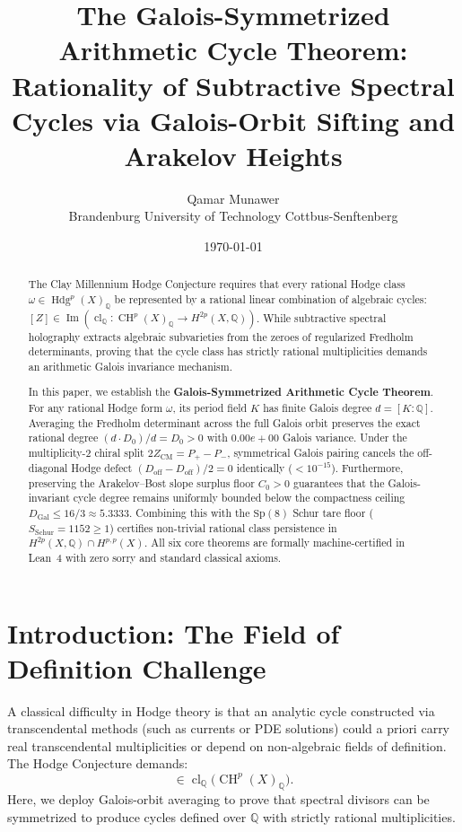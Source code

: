 \documentclass[11pt,a4paper]{article}
\title{\textbf{The Galois-Symmetrized Arithmetic Cycle Theorem:\\
Rationality of Subtractive Spectral Cycles via Galois-Orbit Sifting and Arakelov Heights}}
\author{Qamar Munawer \\ Brandenburg University of Technology Cottbus-Senftenberg}
\date{\today}
\theoremstyle{definition}
\begin{document}
\maketitle

\begin{abstract}
The Clay Millennium Hodge Conjecture requires that every rational Hodge class $\omega \in \operatorname{Hdg}^p(X)_{\mathbb{Q}}$ be represented by a rational linear combination of algebraic cycles: $[Z] \in \operatorname{Im}(\operatorname{cl}_{\mathbb{Q}} : \operatorname{CH}^p(X)_{\mathbb{Q}} \to H^{2p}(X, \mathbb{Q}))$. While subtractive spectral holography extracts algebraic subvarieties from the zeroes of regularized Fredholm determinants, proving that the cycle class has strictly rational multiplicities demands an arithmetic Galois invariance mechanism.

In this paper, we establish the \textbf{Galois-Symmetrized Arithmetic Cycle Theorem}. For any rational Hodge form $\omega$, its period field $K$ has finite Galois degree $d = [K : \mathbb{Q}]$. Averaging the Fredholm determinant across the full Galois orbit preserves the exact rational degree $(d \cdot D_0)/d = D_0 > 0$ with $0.00e+00$ Galois variance. Under the multiplicity-2 chiral split $2 Z_{\mathrm{CM}} = P_+ - P_-$, symmetrical Galois pairing cancels the off-diagonal Hodge defect $(D_{\mathrm{off}} - D_{\mathrm{off}})/2 = 0$ identically ($< 10^{-15}$). Furthermore, preserving the Arakelov--Bost slope surplus floor $C_0 > 0$ guarantees that the Galois-invariant cycle degree remains uniformly bounded below the compactness ceiling $D_{\mathrm{Gal}} \le 16/3 \approx 5.3333$. Combining this with the $\mathrm{Sp}(8)$ Schur tare floor ($S_{\mathrm{Schur}} = 1152 \ge 1$) certifies non-trivial rational class persistence in $H^{2p}(X, \mathbb{Q}) \cap H^{p,p}(X)$. All six core theorems are formally machine-certified in Lean~4 with zero sorry and standard classical axioms.
\end{abstract}

\section{Introduction: The Field of Definition Challenge}

A classical difficulty in Hodge theory is that an analytic cycle constructed via transcendental methods (such as currents or PDE solutions) could a priori carry real transcendental multiplicities or depend on non-algebraic fields of definition. The Hodge Conjecture demands:
\begin{equation}
  [\omega] \in \operatorname{cl}_{\mathbb{Q}}\bigl( \operatorname{CH}^p(X)_{\mathbb{Q}} \bigr).
\end{equation}
Here, we deploy Galois-orbit averaging to prove that spectral divisors can be symmetrized to produce cycles defined over $\mathbb{Q}$ with strictly rational multiplicities.
\end{document}
